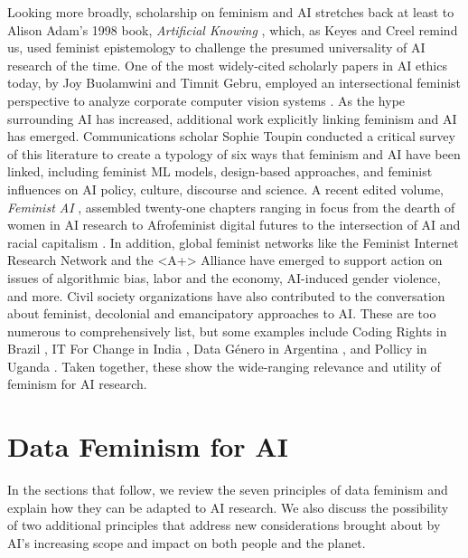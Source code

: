 Looking more broadly, scholarship on feminism and AI stretches back at least to Alison Adam's 1998 book, \textit{Artificial Knowing} \cite{Adam1998-hu}, which, as Keyes and Creel \cite{Keyes_Creel_2022} remind us, used feminist epistemology to challenge the presumed universality of AI research of the time. One of the most widely-cited scholarly papers in AI ethics today, by Joy Buolamwini and Timnit Gebru, employed an intersectional feminist perspective to analyze corporate computer vision systems \cite{Buolamwini_Gebru_2018}. As the hype surrounding AI has increased, additional work explicitly linking feminism and AI has emerged. Communications scholar Sophie Toupin \cite{Toupin2023} conducted a critical survey of this literature to create a typology of six ways that feminism and AI have been linked, including feminist ML models, design-based approaches, and feminist influences on AI policy, culture, discourse and science. A recent edited volume, \textit{Feminist AI} \cite{Browne_Cave_Drage_McInerney_2024}, assembled twenty-one chapters ranging in focus from the dearth of women in AI research \cite{Wajcman_Young_2023} to Afrofeminist digital futures \cite{Neema_Chenai_Garnett_2023} to the intersection of AI and racial capitalism \cite{Hampton_2023}. In addition, global feminist networks like the Feminist Internet Research Network \cite{Feminist_Internet} and the <A+> Alliance \cite{Alliance} have emerged to support action on issues of algorithmic bias, labor and the economy, AI-induced gender violence, and more. Civil society organizations have also contributed to the conversation about feminist, decolonial and emancipatory approaches to AI. These are too numerous to comprehensively list, but some examples include Coding Rights in Brazil \cite{Hacking}, IT For Change in India \cite{IT_for_Change}, Data Género in Argentina \cite{Data_Genero_2023}, and Pollicy in Uganda \cite{Pollicy}. Taken together, these show the wide-ranging relevance and utility of feminism for AI research. 

\section{Data Feminism for AI}

In the sections that follow, we review the seven principles of data feminism and explain how they can be adapted to AI research. We also discuss the possibility of two additional principles that address new considerations brought about by AI’s increasing scope and impact on both people and the planet.    

